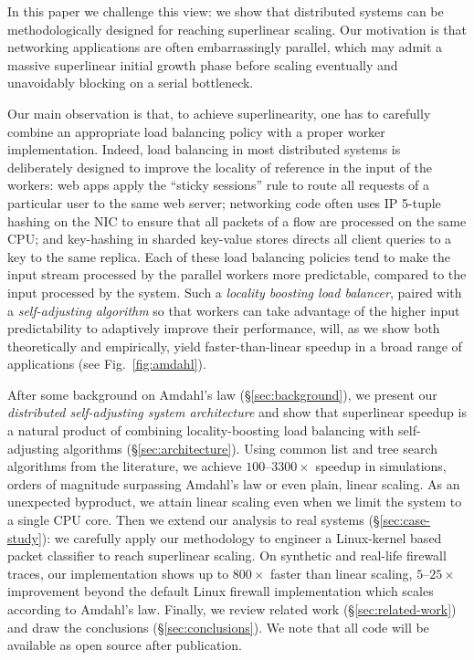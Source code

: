In this paper we challenge this view: we show that distributed systems can be methodologically designed for reaching superlinear scaling. Our motivation is that networking applications are often embarrassingly parallel, %
which may admit a massive superlinear initial growth phase before scaling eventually and unavoidably blocking on a serial bottleneck.

Our main observation is that, to achieve superlinearity, one has to carefully combine an appropriate load balancing policy with a proper worker implementation. Indeed, load balancing in most distributed systems is deliberately designed to improve the locality of reference in the input of the workers: web apps apply the ``sticky sessions'' rule to route all requests of a particular user to the same web server; %
networking code often uses IP 5-tuple hashing on the NIC to ensure that all packets of a flow are processed on the same CPU; %
and key-hashing in sharded key-value stores directs all client queries to a key to the same replica. Each of these load balancing policies tend to make the input stream processed by the parallel workers more predictable, compared to the input processed by the system. Such a \emph{locality boosting load balancer}, paired with a \emph{self-adjusting algorithm} so that workers can take advantage of the higher input predictability to adaptively improve their performance, will, as we show both theoretically and empirically, yield faster-than-linear speedup in a broad range of applications (see Fig.~\ref{fig:amdahl}). %

After some background on Amdahl's law (\S\ref{sec:background}), we present our \emph{distributed self-adjusting system architecture} and show that superlinear speedup is a natural product of combining locality-boosting load balancing with self-adjusting algorithms (\S\ref{sec:architecture}). Using common list and tree search algorithms from the literature, we achieve $100$--$3300\times$ speedup in simulations, orders of magnitude surpassing Amdahl's law or even plain, linear scaling. As an unexpected byproduct, we attain linear scaling even when we limit the system to a single CPU core. Then we extend our analysis to real systems (\S\ref{sec:case-study}): we carefully apply our methodology to engineer a Linux-kernel based packet classifier to reach superlinear scaling. On synthetic and real-life firewall traces, our implementation shows up to $800\times$ faster than linear scaling, $5$--$25\times$ improvement beyond the default Linux firewall implementation which scales according to Amdahl's law. Finally, we review related work (\S\ref{sec:related-work}) and draw the conclusions (\S\ref{sec:conclusions}). We note that all code will be available as open source after publication.


